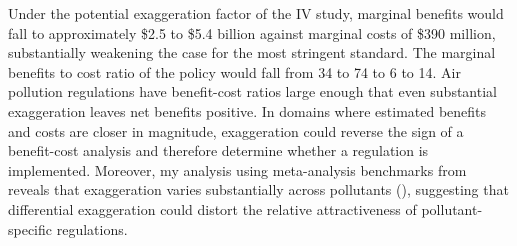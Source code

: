 \documentclass[12pt]{article}
\begin{document}
		Under the potential exaggeration factor of the IV study, marginal benefits would fall to approximately \$2.5 to \$5.4 billion against marginal costs of \$390 million, substantially weakening the case for the most stringent standard. The marginal benefits to cost ratio of the policy would fall from 34 to 74 to 6 to 14. Air pollution regulations have benefit-cost ratios large enough that even substantial exaggeration leaves net benefits positive. In domains where estimated benefits and costs are closer in magnitude, exaggeration could reverse the sign of a benefit-cost analysis and therefore determine whether a regulation is implemented. Moreover, my analysis using meta-analysis benchmarks from \cite{shah_short_2015} reveals that exaggeration varies substantially across pollutants (), suggesting that differential exaggeration could distort the relative attractiveness of pollutant-specific regulations.	
		
\end{document}
